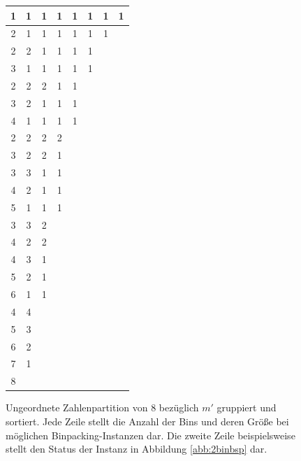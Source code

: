 \documentclass{scrreprt}
\begin{document}
\begin{figure}
    \begin{center}
        \begin{tabular}{cccccccc}
            1 & 1 & 1 & 1 & 1 & 1 & 1 & 1  \\ \hline
            2 & 1 & 1 & 1 & 1 & 1 & 1 & \\ \hline
            2 & 2 & 1 & 1 & 1 & 1 & &\\
            3 & 1 & 1 & 1 & 1 & 1 & &\\ \hline
            2 & 2 & 2 & 1 & 1 & & &\\
            3 & 2 & 1 & 1 & 1 & & &\\
            4 & 1 & 1 & 1 & 1 & & &\\ \hline
            2 & 2 & 2 & 2 & & & &\\
            3 & 2 & 2 & 1 & & & &\\
            3 & 3 & 1 & 1 & & & &\\
            4 & 2 & 1 & 1 & & & &\\
            5 & 1 & 1 & 1 & & & &\\ \hline
            3 & 3 & 2 & & & & &\\
            4 & 2 & 2 & & & & &\\
            4 & 3 & 1 & & & & &\\
            5 & 2 & 1 & & & & &\\
            6 & 1 & 1 & & & & &\\ \hline
            4 & 4 & & & & & &\\
            5 & 3 & & & & & &\\
            6 & 2 & & & & & &\\
            7 & 1 & & & & & &\\ \hline
            8 & & & & & & &
        \end{tabular}
    \end{center}
    \caption{
        \label{abb:binpart}
        Ungeordnete Zahlenpartition von $8$ bezüglich $m'$ gruppiert und sortiert.
        Jede Zeile stellt die Anzahl der Bins und deren Größe bei möglichen Binpacking-Instanzen dar.
        Die zweite Zeile beispielsweise stellt den Status der Instanz in Abbildung \ref{abb:2binbsp} dar.
    }
\end{figure}
\end{document}
